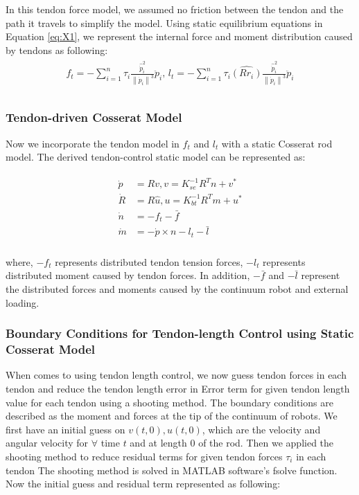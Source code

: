 In this tendon force model, we assumed no friction between the tendon and the path it travels to simplify the model. Using static equilibrium equations in Equation \eqref{eq:X1}, we represent the internal force and moment distribution caused by tendons as following:
\begin{align}
   \begin{split}
       f_{t}=-\sum_{i=1}^{n}\tau_{i}\frac{\hat{\dot{p}}^{2}_{i}}{\left \|\dot{p}_{i}  \right \|^{3}}\ddot{p}_{i},\, 
        l_{t}=-\sum_{i=1}^{n}\tau_{i}\hat{(Rr_{i})}\frac{\hat{\dot{p}}^{2}_{i}}{\left \|\dot{p}_{i}  \right \|^{3}}\ddot{p}_{i}\\
     \end{split}
     \label{eq:X3}
\end{align}


\subsubsection{Tendon-driven Cosserat Model}
Now we incorporate the tendon model in $f_{t}$ and $l_{t}$ with a static Cosserat rod model. The derived tendon-control static model can be represented as:

\begin{align}
    \begin{split}
    \dot{p} & = Rv, v = K_{se}^{-1}R^Tn + v^{*}\\
    \dot{R} & = R\widehat{u}, u = K_{bt}^{-1}R^Tm + u^{*}\\
    \dot{n} & = -f_t -\bar{f}\\
    \dot{m} & = -\dot{p}\times{n}-l_t-\bar{l}\\
     \end{split}
     \label{eq:X4}
\end{align}

where, $-f_t$ represents distributed tendon tension forces, $-l_t$ represents distributed moment caused by tendon forces. In addition, $-\bar{f}$ and $-\bar{l}$ represent the distributed forces and moments caused by the continuum robot and external loading. 

\subsubsection{Boundary Conditions for Tendon-length Control using Static Cosserat Model}

When comes to using tendon length control, we now guess tendon forces in each tendon and reduce the tendon length error in Error term for given tendon length value for each tendon using a shooting method. The boundary conditions are described as the moment and forces at the tip of the continuum of robots. We first have an initial guess on $v(t,0), u(t,0)$, which are the velocity and angular velocity for $\forall$ time $t$ and at length 0 of the rod. Then we applied the shooting method to reduce residual terms for given tendon forces $\tau_i$ in each tendon The shooting method is solved in MATLAB software's fsolve function. Now the initial guess and residual term represented as following:


